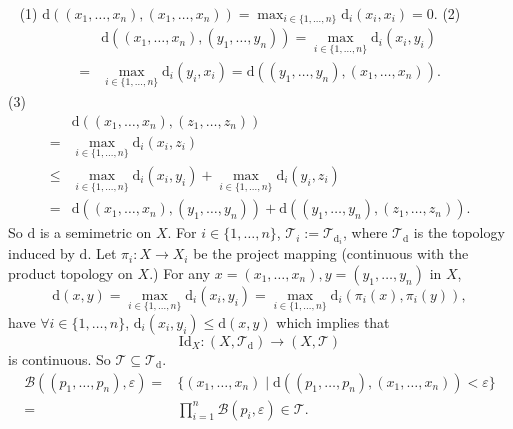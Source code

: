 \begin{proofenv}
    \ \newline
    (1) $\mathrm{d}\left((x_1,\dots,x_n),(x_1,\dots,x_n)\right)=\max_{i\in\{1,\dots,n\}}\mathrm{d}_i(x_i,x_i)=0$.
    \newline
    (2) \begin{align*}
        &\mathrm{d}\left((x_1,\dots,x_n),(y_1,\dots,y_n)\right)=\max_{i\in\{1,\dots,n\}}\mathrm{d}_i(x_i,y_i)\\
        =&\max_{i\in\{1,\dots,n\}}\mathrm{d}_i(y_i,x_i)=\mathrm{d}\left((y_1,\dots,y_n),(x_1,\dots,x_n)\right).
    \end{align*}
    (3) \begin{align*}
        &\mathrm{d}((x_1,\dots,x_n),(z_1,\dots,z_n))\\
        =&\max_{i\in\{1,\dots,n\}}\mathrm{d}_i(x_i,z_i)\\
        \le&\max_{i\in\{1,\dots,n\}}\mathrm{d}_i(x_i,y_i)+\max_{i\in\{1,\dots,n\}}\mathrm{d}_i(y_i,z_i)\\
        =&\mathrm{d}((x_1,\dots,x_n),(y_1,\dots,y_n))+\mathrm{d}((y_1,\dots,y_n),(z_1,\dots,z_n)).
    \end{align*}
    So $\mathrm{d}$ is a semimetric on $X$. For $i\in \{1,\dots,n\}$, $\mathscr{T}_i:=\mathscr{T}_{\mathrm{d}_i}$, where $\mathscr{T}_\mathrm{d}$ is the topology induced by $\mathrm{d}$. Let $\pi_i: X\longrightarrow X_i$ be the project mapping (continuous with the product topology on $X$.) For any $x=(x_1,\dots,x_n), y=(y_1,\dots,y_n)$ in $X$,
    $$\mathrm{d}(x,y)=\max_{i\in\{1,\dots,n\}}\mathrm{d}_i(x_i,y_i)=\max_{i\in\{1,\dots,n\}}\mathrm{d}_i(\pi_i(x),\pi_i(y)),$$
    have $\forall i\in\{1,\dots,n\}$, $\mathrm{d}_i(x_i,y_i)\le \mathrm{d}(x,y)$ 
    which implies that 
    $$\mathrm{Id}_X:(X,\mathscr{T}_\mathrm{d})\longrightarrow (X,\mathscr{T})$$
    is continuous. So $\mathscr{T}\subseteq\mathscr{T}_\mathrm{d}.$
    \begin{align*}
        \mathcal{B}((p_1,\dots,p_n),\varepsilon)=&\{(x_1,\dots,x_n)\mid \mathrm{d}((p_1,\dots,p_n),(x_1,\dots,x_n))<\varepsilon\}\\
        =&\prod_{i=1}^n\mathcal{B}(p_i,\varepsilon)\in\mathscr{T}.
    \end{align*}
\end{proofenv}



